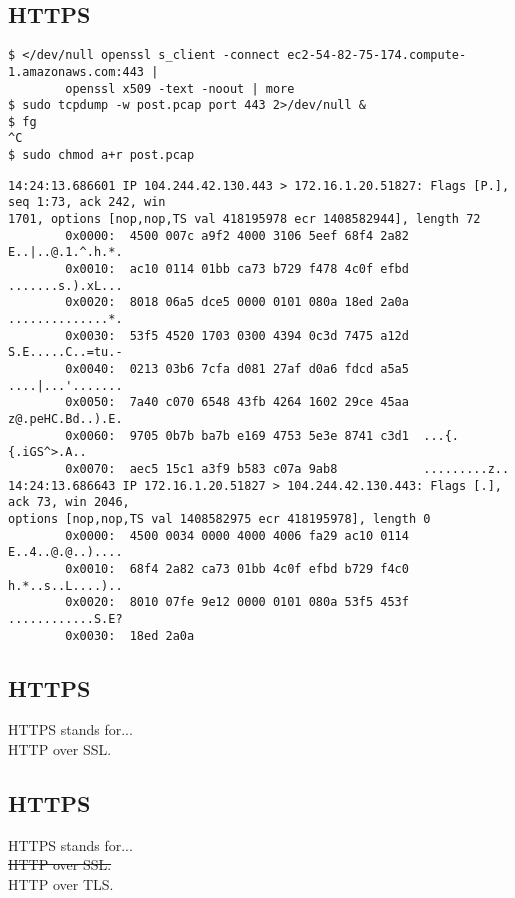 \documentclass[xga]{xdvislides}
\begin{document}
\subsection{HTTPS}
\begin{verbatim}
$ </dev/null openssl s_client -connect ec2-54-82-75-174.compute-1.amazonaws.com:443 |
        openssl x509 -text -noout | more
$ sudo tcpdump -w post.pcap port 443 2>/dev/null &
$ fg
^C
$ sudo chmod a+r post.pcap
\end{verbatim}
\small
\begin{verbatim}
14:24:13.686601 IP 104.244.42.130.443 > 172.16.1.20.51827: Flags [P.], seq 1:73, ack 242, win
1701, options [nop,nop,TS val 418195978 ecr 1408582944], length 72
        0x0000:  4500 007c a9f2 4000 3106 5eef 68f4 2a82  E..|..@.1.^.h.*.
        0x0010:  ac10 0114 01bb ca73 b729 f478 4c0f efbd  .......s.).xL...
        0x0020:  8018 06a5 dce5 0000 0101 080a 18ed 2a0a  ..............*.
        0x0030:  53f5 4520 1703 0300 4394 0c3d 7475 a12d  S.E.....C..=tu.-
        0x0040:  0213 03b6 7cfa d081 27af d0a6 fdcd a5a5  ....|...'.......
        0x0050:  7a40 c070 6548 43fb 4264 1602 29ce 45aa  z@.peHC.Bd..).E.
        0x0060:  9705 0b7b ba7b e169 4753 5e3e 8741 c3d1  ...{.{.iGS^>.A..
        0x0070:  aec5 15c1 a3f9 b583 c07a 9ab8            .........z..
14:24:13.686643 IP 172.16.1.20.51827 > 104.244.42.130.443: Flags [.], ack 73, win 2046,
options [nop,nop,TS val 1408582975 ecr 418195978], length 0
        0x0000:  4500 0034 0000 4000 4006 fa29 ac10 0114  E..4..@.@..)....
        0x0010:  68f4 2a82 ca73 01bb 4c0f efbd b729 f4c0  h.*..s..L....)..
        0x0020:  8010 07fe 9e12 0000 0101 080a 53f5 453f  ............S.E?
        0x0030:  18ed 2a0a
\end{verbatim}
\Normalsize

\subsection{HTTPS}
HTTPS stands for... \\

HTTP over SSL.

\subsection{HTTPS}
HTTPS stands for... \\

\sout{HTTP over SSL.} \\

HTTP over TLS.
\end{document}
